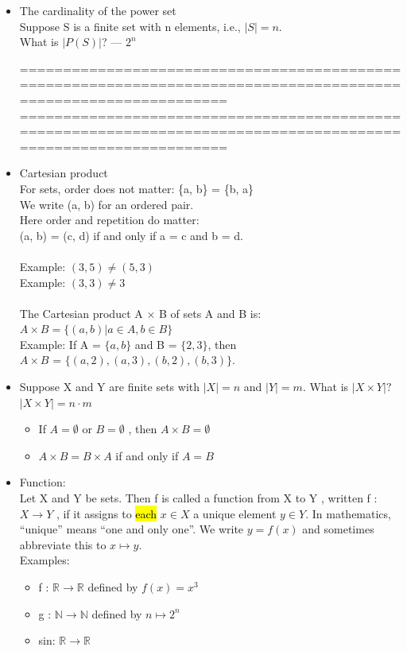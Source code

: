 \documentclass{article}
\begin{document}
\begin{itemize}
\item The cardinality of the power set\\
Suppose S is a finite set with n elements, i.e., $|S| = n$.\\
What is $|P(S)|$? ---
$2^n$

================================================================================================================
\newpage
================================================================================================================
\item Cartesian product\\
For sets, order does not matter: \{a, b\} = \{b, a\}\\
We write (a, b) for an ordered pair.\\
Here order and repetition do matter:\\
(a, b) = (c, d) if and only if a = c and b = d.\\\\
Example: $(3, 5) \neq (5, 3)$\\
Example: $(3, 3) \neq 3$
\\\\
The Cartesian product A × B of sets A and B is:\\
$A \times B = \{ (a, b) | a \in A, b \in B\}$\\
Example: If A = $\{a, b\}$ and B = $\{2, 3\}$, then\\
$A \times B$ = $\{ (a, 2), (a, 3), (b, 2), (b, 3) \}$.

\item Suppose X and Y are finite sets with $|X| = n$ and $|Y| = m$.
What is $|X \times Y |?$\\
$|X \times Y | = n \cdot m$\\

\begin{itemize}
\item If $A =  \emptyset$ or $B = \emptyset$ , then $A \times B = \emptyset$
\item $A \times B = B \times A$ if and only if $A = B$
\end{itemize}
\item Function:\\
Let X and Y be sets.
Then f is called a function from X to Y , written f : $X \rightarrow Y$ ,
if it assigns to \hl{each} $x \in X$ a unique element $y \in Y$.
In mathematics, “unique” means “one and only one”.
We write $y = f (x)$ and sometimes abbreviate this to $x \mapsto y$.\\
Examples:
\begin{itemize}
\item f : $\mathbb{R} \rightarrow \mathbb{R}$ defined by $f(x)= x^3$
\item g :  $\mathbb{N} \rightarrow \mathbb{N}$ defined by $n \mapsto 2^n$
\item sin: $\mathbb{R} \rightarrow \mathbb{R}$
\end{itemize}



\end{itemize}
\end{document}
